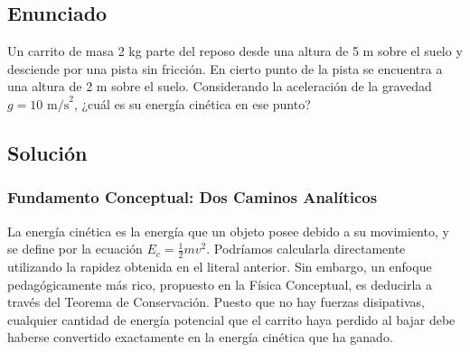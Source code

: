 \documentclass[12pt,a4paper]{article}
\begin{document}
\newpage
\subsection*{Enunciado}
Un carrito de masa 2 kg parte del reposo desde una altura de 5 m sobre el suelo y desciende por una pista sin fricción. En cierto punto de la pista se encuentra a una altura de 2 m sobre el suelo. Considerando la aceleración de la gravedad $g = 10 \text{ m/s}^2$, ¿cuál es su energía cinética en ese punto?

\begin{center}
\end{center}

\subsection*{Solución}

\subsubsection*{Fundamento Conceptual: Dos Caminos Analíticos}
La energía cinética es la energía que un objeto posee debido a su movimiento, y se define por la ecuación $E_c = \frac{1}{2}mv^2$. Podríamos calcularla directamente utilizando la rapidez obtenida en el literal anterior. Sin embargo, un enfoque pedagógicamente más rico, propuesto en la Física Conceptual, es deducirla a través del Teorema de Conservación. Puesto que no hay fuerzas disipativas, cualquier cantidad de energía potencial que el carrito haya perdido al bajar debe haberse convertido exactamente en la energía cinética que ha ganado.
\end{document}
